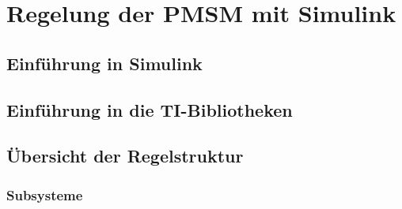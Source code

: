 
\chapter{Regelung der PMSM mit Simulink}
\label{cha:regelungpmsm}

\section{Einführung in Simulink}\label{sec:simulink}

\section{Einführung in die TI-Bibliotheken}\label{sec:TI}

\section{Übersicht der Regelstruktur}\label{sec:ueberregelung}

\subsection{Subsysteme}





